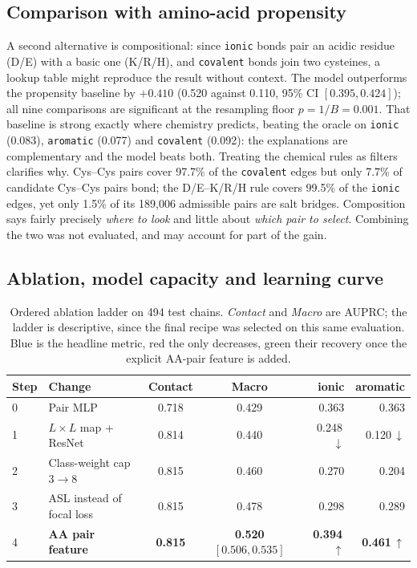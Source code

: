 \documentclass[12pt]{article}
\begin{document}
\subsection{Comparison with amino-acid propensity}
\label{sec:notcomposition}

A second alternative is compositional: since \texttt{ionic} bonds pair an acidic residue
(D/E) with a basic one (K/R/H), and \texttt{covalent} bonds join two cysteines, a lookup
table might reproduce the result without context. The model outperforms the propensity baseline by
$+0.410$ (0.520 against 0.110, 95\% CI $[0.395, 0.424]$); all nine comparisons are
significant at the resampling floor $p=1/B=0.001$. That baseline is strong exactly where chemistry predicts,
beating the oracle on \texttt{ionic} (0.083), \texttt{aromatic} (0.077) and
\texttt{covalent} (0.092): the explanations are complementary and the model beats both. Treating the chemical rules as filters clarifies why. Cys--Cys pairs cover 97.7\% of the
\texttt{covalent} edges but only 7.7\% of candidate Cys--Cys pairs bond; the D/E--K/R/H rule covers 99.5\%
of the \texttt{ionic} edges, yet only 1.5\% of its 189,006 admissible pairs are salt
bridges. Composition says fairly precisely \emph{where to look} and little about \emph{which
pair to select}. Combining the two was not evaluated, and may account for part of the gain.

\subsection{Ablation, model capacity and learning curve}
\label{sec:ablation}

\begin{table}[tb]
\centering
\caption{Ordered ablation ladder on 494 test chains. \emph{Contact} and \emph{Macro}
are AUPRC; the ladder is descriptive, since the final recipe was selected on this same
evaluation. \colorbox{accentfill}{Blue} is the headline metric, \colorbox{queda}{red}
the only decreases, \colorbox{alta}{green} their recovery once the explicit AA-pair
feature is added.}
\label{tab:ablation}
\scriptsize
\renewcommand{\arraystretch}{1.0}
\setlength{\tabcolsep}{5pt}
\begin{tabular}{llc>{\columncolor{accentfill}}crr}
\toprule
\rowcolor{cabec}
Step & Change & Contact & Macro & ionic & aromatic \\
\midrule
0 & Pair MLP                            & 0.718 & 0.429 & 0.363 & 0.363 \\
1 & $L{\times}L$ map + ResNet        & 0.814 & 0.440 & \cellcolor{queda}0.248\,$\downarrow$ & \cellcolor{queda}0.120\,$\downarrow$ \\
2 & Class-weight cap $3\to8$          & 0.815 & 0.460 & 0.270 & 0.204 \\
3 & ASL instead of focal loss    & 0.815 & 0.478 & 0.298 & 0.289 \\
4 & \textbf{AA pair feature}            & \textbf{0.815} & \textbf{0.520} \tiny$[0.506,0.535]$ & \cellcolor{alta}\textbf{0.394}\,$\uparrow$ & \cellcolor{alta}\textbf{0.461}\,$\uparrow$ \\
\bottomrule
\end{tabular}
\end{table}
\end{document}
